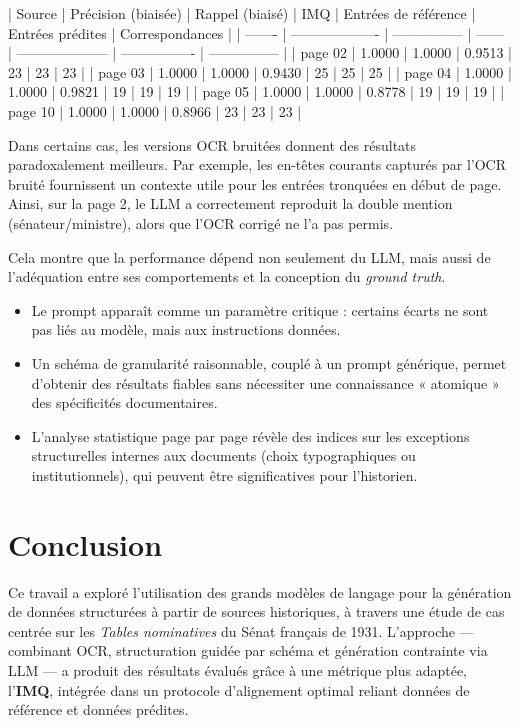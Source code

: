 | Source  | Précision (biaisée) | Rappel (biaisé) | IMQ    | Entrées de référence | Entrées prédites | Correspondances |
| ------- | ------------------- | --------------- | ------ | -------------------- | ---------------- | --------------- |
| page 02 | 1.0000              | 1.0000          | 0.9513 | 23                   | 23               | 23              |
| page 03 | 1.0000              | 1.0000          | 0.9430 | 25                   | 25               | 25              |
| page 04 | 1.0000              | 1.0000          | 0.9821 | 19                   | 19               | 19              |
| page 05 | 1.0000              | 1.0000          | 0.8778 | 19                   | 19               | 19              |
| page 10 | 1.0000              | 1.0000          | 0.8966 | 23                   | 23               | 23              |

Dans certains cas, les versions OCR bruitées donnent des résultats paradoxalement meilleurs. Par exemple, les en-têtes courants capturés par l’OCR bruité fournissent un contexte utile pour les entrées tronquées en début de page. Ainsi, sur la page 2, le LLM a correctement reproduit la double mention (sénateur/ministre), alors que l’OCR corrigé ne l’a pas permis.

Cela montre que la performance dépend non seulement du LLM, mais aussi de l’adéquation entre ses comportements et la conception du \emph{ground truth}.

\begin{itemize}
\item Le prompt apparaît comme un paramètre critique : certains écarts ne sont pas liés au modèle, mais aux instructions données.
\item Un schéma de granularité raisonnable, couplé à un prompt générique, permet d’obtenir des résultats fiables sans nécessiter une connaissance « atomique » des spécificités documentaires.
\item L’analyse statistique page par page révèle des indices sur les exceptions structurelles internes aux documents (choix typographiques ou institutionnels), qui peuvent être significatives pour l’historien.

\end{itemize}
\section{Conclusion}

Ce travail a exploré l’utilisation des grands modèles de langage pour la génération de données structurées à partir de sources historiques, à travers une étude de cas centrée sur les \emph{Tables nominatives} du Sénat français de 1931. L’approche — combinant OCR, structuration guidée par schéma et génération contrainte via LLM — a produit des résultats évalués grâce à une métrique plus adaptée, l’\textbf{IMQ}, intégrée dans un protocole d’alignement optimal reliant données de référence et données prédites.

